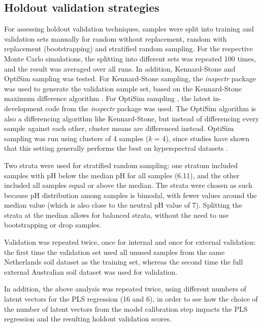 \documentclass{isprs}
\begin{document}
\subsection{Holdout validation strategies}\label{sec:Holdout validation strategies}

For assessing holdout validation techniques, samples were split into training and validation sets manually for random without replacement, random with replacement (bootstrapping) and stratified random sampling. For the respective Monte Carlo simulations, the splitting into different sets was repeated 100 times, and the result was averaged over all runs. In addition, Kennard-Stone and OptiSim sampling was tested. For Kennard-Stone sampling, the \textit{inspectr} package was used to generate the validation sample set, based on the Kennard-Stone maximum difference algorithm \cite{kennard1969computer}. For OptiSim sampling \cite{clark1997optisim}, the latest in-development code from the \textit{inspectr} package was used. The OptiSim algorithm is also a differencing algorithm like Kennard-Stone, but instead of differencing every sample against each other, cluster means are differenced instead. OptiSim sampling was run using clusters of 4 samples (\textit{k} = 4), since studies have shown that this setting generally performs the best on hyperspectral datasets \cite{clark2003boosted}.

Two strata were used for stratified random sampling: one stratum included samples with pH below the median pH for all samples (6.11), and the other included all samples equal or above the median. The strata were chosen as such because pH distribution among samples is bimodal, with fewer values around the median value (which is also close to the neutral pH value of 7). Splitting the strata at the median allows for balanced strata, without the need to use bootstrapping or drop samples.

Validation was repeated twice, once for internal and once for external validation: the first time the validation set used all unused samples from the same Netherlands soil dataset as the training set, whereas the second time the full external Australian soil dataset was used for validation.

In addition, the above analysis was repeated twice, using different numbers of latent vectors for the PLS regression (16 and 6), in order to see how the choice of the number of latent vectors from the model calibration step impacts the PLS regression and the resulting holdout validation scores.
\end{document}
